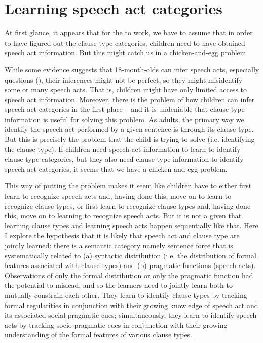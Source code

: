 \section{Learning speech act categories}
\label{sec:intro:sp}

At first glance, it appears that for the \subhypos{} to work, we have to assume that in order to have figured out the clause type categories, children need to have obtained speech act information. But this might catch us in a chicken-and-egg problem.

While some evidence suggests that 18-month-olds can infer speech acts, especially questions (\cite{casillas2017turn, marshmallowqueen}), their inferences might not be perfect, so they might misidentify some or many speech acts. That is, children might have only limited access to speech act information. Moreover, there is the problem of how children can infer speech act categories in the first place -- and it is undeniable that clause type information is useful for solving this problem. As adults, the primary way we identify the speech act performed by a given sentence is through its clause type. But this is precisely the problem that the child is trying to solve (i.e. identifying the clause type). If children need speech act information to learn to identify clause type categories, but they also need clause type information to identify speech act categories, it seems that we have a chicken-and-egg problem. 

This way of putting the problem makes it seem like children have to either first learn to recognize speech acts and, having done this, move on to learn to recognize clause types, or first learn to recognize clause types and, having done this, move on to learning to recognize speech acts. But it is not a given 
that learning clause types and learning speech acts happen sequentially like that. Here I explore the hypothesis that it is likely that speech act and clause type are jointly learned: there is a semantic category namely sentence force that is systematically related to (a) syntactic distribution (i.e. the distribution of formal features associated with clause types) and (b) pragmatic functions (speech acts). Observations of only the formal distribution or only the pragmatic function had the potential to mislead, and so the learners need to jointly learn both to mutually constrain each other. 
They learn to identify clause types by tracking formal regularities in conjunction with their growing
knowledge of speech act and its associated social-pragmatic cues; simultaneously, they learn
to identify speech acts by tracking socio-pragmatic cues in conjunction with their growing
understanding of the formal features of various clause types.


